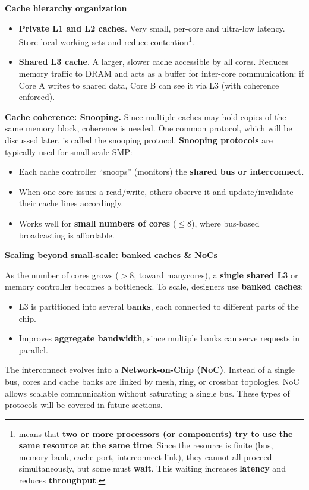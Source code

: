 \highspace
\begin{flushleft}
    \textcolor{Green3}{ \textbf{Cache hierarchy organization}}
\end{flushleft}
\begin{itemize}
    \item \textbf{Private L1 and L2 caches}. Very small, per-core and ultra-low latency. Store local working sets and reduce contention\footnote{%
         means that \textbf{two or more processors (or components) try to use the same resource at the same time}. Since the resource is finite (bus, memory bank, cache port, interconnect link), they cannot all proceed simultaneously, but some must \textbf{wait}. This waiting increases \textbf{latency} and reduces \textbf{throughput}.
    }.
    \item \textbf{Shared L3 cache}. A larger, slower cache accessible by all cores. Reduces memory traffic to DRAM and acts as a buffer for inter-core communication: if Core A writes to shared data, Core B can see it via L3 (with coherence enforced).
\end{itemize}
\textcolor{Green3}{ \textbf{Cache coherence: Snooping.}} Since multiple caches may hold copies of the same memory block, coherence is needed. One common protocol, which will be discussed later, is called the snooping protocol. \textbf{Snooping protocols} are typically used for small-scale SMP:
\begin{itemize}
    \item Each cache controller ``snoops'' (monitors) the \textbf{shared bus or interconnect}.
    \item When one core issues a read/write, others observe it and update/invalidate their cache lines accordingly.
    \item Works well for \textbf{small numbers of cores} ($\le 8$), where bus-based broadcasting is affordable.
\end{itemize}

\highspace
\begin{flushleft}
    \textcolor{Green3}{\faIcon{\speedIcon} \textbf{Scaling beyond small-scale: banked caches \& NoCs}}
\end{flushleft}
As the number of cores grows ($> 8$, toward manycores), a \textbf{single shared L3} or memory controller becomes a bottleneck. To scale, designers use \textbf{banked caches}:
\begin{itemize}
    \item L3 is partitioned into several \textbf{banks}, each connected to different parts of the chip.
    \item Improves \textbf{aggregate bandwidth}, since multiple banks can serve requests in parallel.
\end{itemize}
The interconnect evolves into a \textbf{Network-on-Chip (NoC)}. Instead of a single bus, cores and cache banks are linked by mesh, ring, or crossbar topologies. NoC allows scalable communication without saturating a single bus. These types of protocols will be covered in future sections.